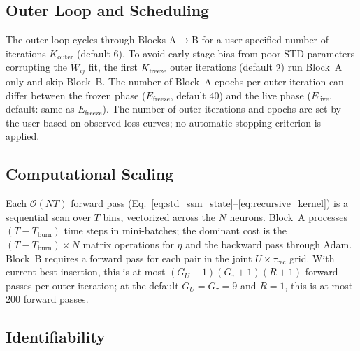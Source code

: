 \documentclass[11pt]{article}
\begin{document}
\subsection{Outer Loop and Scheduling}
\label{sec:outer_loop}

The outer loop cycles through Blocks A$\to$B for a user-specified
number of iterations $K_\text{outer}$ (default $6$).
To avoid early-stage bias from poor STD parameters corrupting the
$\tilde{W}_{ij}$ fit, the first $K_\text{freeze}$ outer iterations
(default $2$) run Block~A only and skip Block~B.
The number of Block~A epochs per outer iteration can differ between the
frozen phase ($E_\text{freeze}$, default $40$) and the live phase
($E_\text{live}$, default: same as $E_\text{freeze}$).
The number of outer iterations and epochs are set by the user based on
observed loss curves; no automatic stopping criterion is applied.

\subsection{Computational Scaling}
\label{sec:scaling}

Each $\mathcal{O}(NT)$ forward pass (Eq.~\ref{eq:std_ssm_state}--\ref{eq:recursive_kernel})
is a sequential scan over $T$ bins, vectorized across the $N$ neurons.
Block~A processes $(T-T_\text{burn})$ time steps in mini-batches;
the dominant cost is the $(T-T_\text{burn})\times N$ matrix operations for
$\eta$ and the backward pass through Adam.
Block~B requires a forward pass for each pair in the joint
$U\times\tau_\text{rec}$ grid. With current-best insertion, this is at most
$(G_U+1)(G_\tau+1)(R+1)$ forward passes per outer iteration; at the default
$G_U=G_\tau=9$ and $R=1$, this is at most $200$ forward passes.

\subsection{Identifiability}
\label{sec:identifiability}
\end{document}
